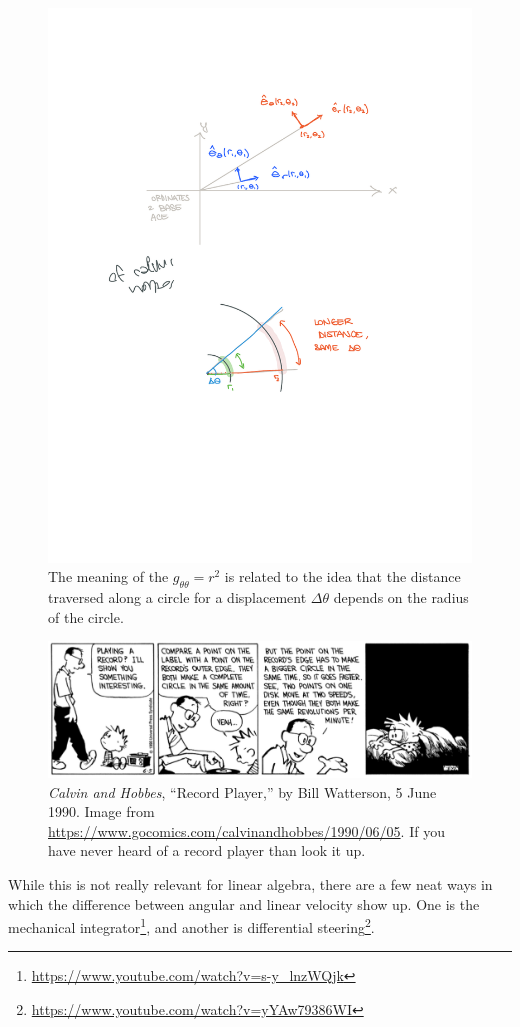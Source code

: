 \documentclass[12pt, oneside]{report}    %
\begin{document}
\begin{figure}[tb]
    \centering
    \includegraphics[width=.4\textwidth]{figures/polar_longer_distance_dtheta.pdf}
    \caption{The meaning of the $g_{\theta\theta} = r^2$ is related to the idea that the distance traversed along a circle for a displacement $\Delta\theta$ depends on the radius of the circle.}
    \label{fig:polar:displacement}
\end{figure}

\begin{figure}[tb]
    \centering
    \includegraphics[width=\textwidth]{figures/calvin_and_hobbes_record.jpg}
    \caption{\emph{Calvin and Hobbes}, ``Record Player,'' by Bill Watterson, 5 June 1990. Image from \url{https://www.gocomics.com/calvinandhobbes/1990/06/05}. If you have never heard of a record player than look it up.}
    \label{fig:CH:record:player}
\end{figure}

\begin{example}
While this is not really relevant for linear algebra, there are a few neat ways in which the difference between angular and linear velocity show up. One is the mechanical integrator\footnote{\url{https://www.youtube.com/watch?v=s-y_lnzWQjk}}, and another is differential steering\footnote{\url{https://www.youtube.com/watch?v=yYAw79386WI}}. 
\end{example}
\end{document}
